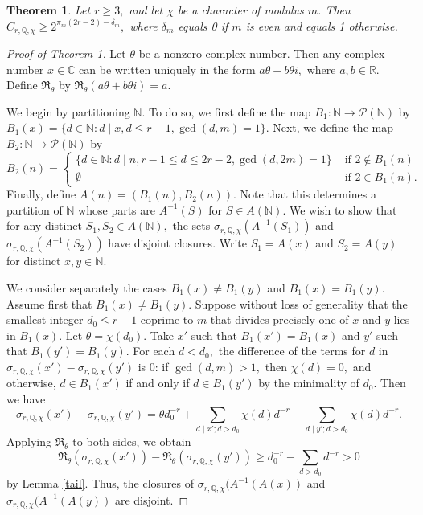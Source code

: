 \documentclass[10pt,a4paper]{amsart}
\newtheorem{theorem}{Theorem}
\newcommand{\C}{\mathbb{C}}
\newcommand{\N}{\mathbb{N}}
\newcommand{\Q}{\mathbb{Q}}
\newcommand{\R}{\mathbb{R}}
\begin{document}
\begin{theorem} \label{lowerbound1}
    Let $r \geq 3,$ and let $\chi$ be a character of modulus $m$. Then $C_{r,\Q,\chi} \geq 2^{\pi_m(2r-2)-\delta_m},$ where $\delta_m$ equals 0 if $m$ is even and equals 1 otherwise. 
\end{theorem}

\begin{proof}[Proof of Theorem \ref{lowerbound1}]
Let $\theta$ be a nonzero complex number. Then any complex number $x \in \C$ can be written uniquely in the form $a \theta + b \theta i,$ where $a,b \in \R.$ Define $\Re_\theta$ by $\Re_\theta(a\theta + b \theta i) = a.$


We begin by partitioning $\N$. To do so, we first define the map $B_1: \N \rightarrow \mathcal{P}(\N)$ by $B_1(x) = \{d \in \N : d \mid x, d \leq r-1, \gcd(d,m)=1\}.$ Next, we define the map $B_2 : \N \rightarrow \mathcal {P} (\N)$ by $$B_2(n) = \begin{cases}
    \{d \in \N : d \mid n, r-1 \leq d \leq 2r-2, \gcd(d, 2m) = 1\} & \text{ if } 2 \not\in B_1(n) \\
    \emptyset &\text{ if }2 \in B_1(n).
\end{cases}$$
Finally, define $A(n) = (B_1(n), B_2(n)).$
Note that this determines a partition of $\N$ whose parts are $A^{-1}(S)$ for $S \in A(\N).$ We wish to show that for any distinct $S_1, S_2 \in A(\N),$ the sets $\sigma_{r,\Q,\chi}(A^{-1}(S_1))$ and $\sigma_{r,\Q,\chi}(A^{-1}(S_2))$ have disjoint closures. Write $S_1 = A(x)$ and $S_2 = A(y)$ for distinct $x,y \in \N.$ 

    We consider separately the cases $B_1(x) \neq B_1(y)$ and $B_1(x) = B_1(y)$. Assume first that $B_1(x) \neq B_1(y)$.  Suppose without loss of generality that the smallest integer $d_0 \leq r-1$ coprime to $m$ that divides precisely one of $x$ and $y$ lies in $B_1(x)$. Let $\theta = \chi(d_0).$ Take $x'$ such that $B_1(x') = B_1(x)$ and $y'$ such that $B_1(y') = B_1(y).$ For each $d < d_0,$ the difference of the terms for $d$ in $\sigma_{r,\Q,\chi} (x') - \sigma_{r, \Q,\chi}(y')$ is 0: if $\gcd(d,m) > 1,$ then $\chi(d) = 0,$ and otherwise, $d \in B_1(x')$ if and only if $d \in B_1(y')$ by the minimality of $d_0.$ Then we have $$\sigma_{r,\Q,\chi} (x') - \sigma_{r, \Q,\chi}(y') = \theta d_0^{-r} + \sum_{d \mid x'; d > d_0} \chi(d)  d^{-r} - \sum_{d \mid y'; d > d_0} \chi(d) d^{-r}.$$ Applying $\Re_\theta$ to both sides, we obtain $$\Re_\theta(\sigma_{r,\Q,\chi}(x')) - \Re_\theta(\sigma_{r,\Q,\chi}(y')) \geq d_0^{-r} - \sum_{d > d_0} d^{-r} > 0$$ by Lemma \ref{tail}. 
Thus, the closures of $\sigma_{r,\Q,\chi}(A^{-1}(A(x))$ and $\sigma_{r,\Q,\chi}(A^{-1}(A(y))$ are disjoint. 


\end{proof}
\end{document}
